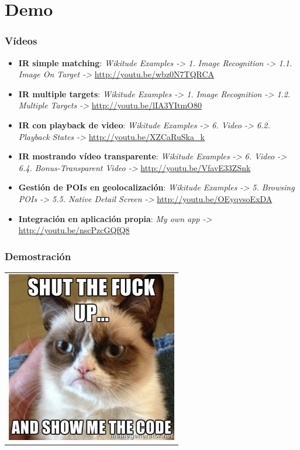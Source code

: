 \section{Demo}
\frame
{
\frametitle{Vídeos}
{
\begin{itemize}
  \item \textbf{IR simple matching}: \textit{Wikitude Examples -> 1. Image Recognition -> 1.1. Image On Target ->} \url{http://youtu.be/wbz0N7TQRCA}
  \item \textbf{IR multiple targets}: \textit{Wikitude Examples -> 1. Image Recognition -> 1.2. Multiple Targets ->} \url{http://youtu.be/lIA3YItmO80}
  \item \textbf{IR con playback de video}: \textit{Wikitude Examples -> 6. Video -> 6.2. Playback States ->} \url{http://youtu.be/XZCaRuSka_k}
  \item \textbf{IR mostrando vídeo transparente}: \textit{Wikitude Examples -> 6. Video -> 6.4. Bonus-Transparent Video ->} \url{http://youtu.be/VfavE33ZSnk}
  \item \textbf{Gestión de POIs en geolocalización}: \textit{Wikitude Examples -> 5. Browsing POIs -> 5.5. Native Detail Screen ->} \url{http://youtu.be/OEyqvsoExDA}
  \item \textbf{Integración en aplicación propia}: \textit{My own app ->} \url{http://youtu.be/nscPzcGQfQ8}
\end{itemize}
}
}

\frame
{
\frametitle{Demostración}
{
\begin{table}[ht]
  \centering
  \begin{tabular}{c}
    \includegraphics[height=7.5cm]{imgs/demo.jpg}
  \end{tabular}
\end{table}
}
}
